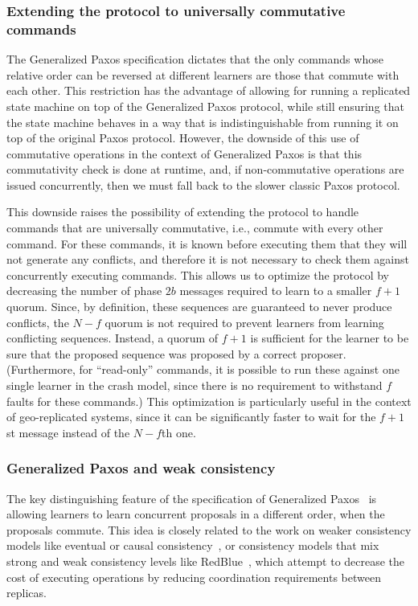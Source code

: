 \subsubsection{Extending the protocol to universally commutative commands}
The Generalized Paxos specification dictates that the only commands whose relative order can be reversed at different learners are those that commute with each other. This restriction has the advantage of allowing for running a replicated state machine on top of the Generalized Paxos protocol, while still ensuring that the state machine behaves in a way that is indistinguishable from running it on top of the original Paxos protocol. However, the downside of this use of commutative operations in the context of Generalized Paxos is that this commutativity check is done at runtime, and, if non-commutative operations are issued concurrently, then we must fall back to the slower classic Paxos protocol.\par
This downside raises the possibility of extending the protocol to handle commands that are universally commutative, i.e., commute with every other command. For these commands, it is known before executing them that they will not generate any conflicts, and therefore it is not necessary to check them against concurrently executing commands. This allows us to optimize the protocol by decreasing the number of phase $2b$ messages required to learn to a smaller $f+1$ quorum. Since, by definition, these sequences are guaranteed to never produce conflicts, the $N-f$ quorum is not required to prevent learners from learning conflicting sequences. Instead, a quorum of $f+1$ is sufficient for the learner to be sure that the proposed sequence was proposed by a correct proposer. (Furthermore, for ``read-only'' commands, it is possible to run these against one single learner in the crash model, since there is no requirement to withstand $f$ faults for these commands.) This optimization is particularly useful in the context of geo-replicated systems, since it can be significantly faster to wait for the $f+1$st message instead of the $N-f$th one.

\subsubsection{Generalized Paxos and weak consistency}
The key distinguishing feature of the specification of Generalized Paxos~\cite{Lamport2005} is allowing learners to learn concurrent proposals in a different order, when the proposals commute. This idea is closely related to the work on weaker consistency models like eventual or causal consistency~\cite{Ahamad1995}, or consistency models that mix
strong and weak consistency levels like RedBlue~\cite{Li2012}, which attempt to decrease the cost of executing operations by reducing coordination requirements between replicas. 

